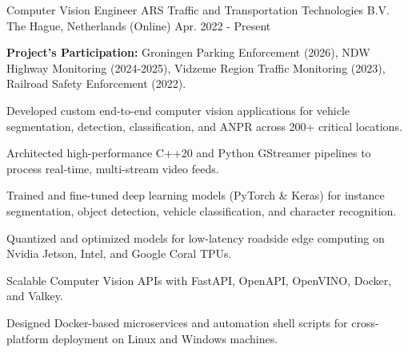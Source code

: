 

\begin{cventries}

  \cventry
    {Computer Vision Engineer} %
    {ARS Traffic and Transportation Technologies B.V.} %
    {The Hague, Netherlands (Online)} %
    {Apr. 2022 - Present} %
    {
      \begin{cvitems} %
        \item {\textbf{Project's Participation:}  Groningen Parking Enforcement (2026),  NDW Highway Monitoring (2024-2025),  Vidzeme Region Traffic Monitoring (2023),  Railroad Safety Enforcement (2022).}
        \item {Developed custom end-to-end computer vision applications for vehicle segmentation, detection, classification, and ANPR across 200+ critical locations.}
        \item {Architected high-performance C++20 and Python GStreamer pipelines to process real-time, multi-stream video feeds.}
        \item {Trained and fine-tuned deep learning models (PyTorch \& Keras) for instance segmentation, object detection, vehicle classification, and character recognition.}
        \item {Quantized and optimized models for low-latency roadside edge computing on Nvidia Jetson, Intel, and Google Coral TPUs.}
        \item {Scalable Computer Vision APIs with FastAPI, OpenAPI, OpenVINO, Docker, and Valkey.}
        \item {Designed Docker-based microservices and automation shell scripts for cross-platform deployment on Linux and Windows machines.}
      \end{cvitems}
    }


\end{cventries}
